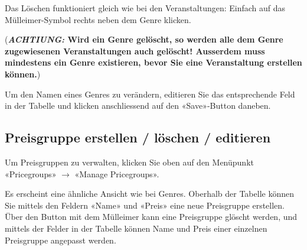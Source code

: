 \documentclass[11pt,a4paper,titlepage,portrait,ngerman,final]{scrartcl}
\begin{document}
Das Löschen funktioniert gleich wie bei den Veranstaltungen: Einfach auf das Mülleimer-Symbol rechts neben dem Genre klicken. 

(\textbf{\textsl{ACHTIUNG:} Wird ein Genre gelöscht, so werden alle dem Genre zugewiesenen Veranstaltungen auch gelöscht! Ausserdem muss mindestens ein Genre existieren, bevor Sie eine Veranstaltung erstellen können.})

Um den Namen eines Genres zu verändern, editieren Sie das entsprechende Feld in der Tabelle und klicken anschliessend auf den «Save»-Button daneben.

\subsection{Preisgruppe erstellen / löschen / editieren}
Um Preisgruppen zu verwalten, klicken Sie oben auf den Menüpunkt «Pricegroups» $\rightarrow$ «Manage Pricegroups».

Es erscheint eine ähnliche Ansicht wie bei Genres. Oberhalb der Tabelle können Sie mittels den Feldern «Name» und «Preis» eine neue Preisgruppe erstellen. Über den Button mit dem Mülleimer kann eine Preisgruppe glöscht werden, und mittels der Felder in der Tabelle können Name und Preis einer einzelnen Preisgruppe angepasst werden.
\end{document}
